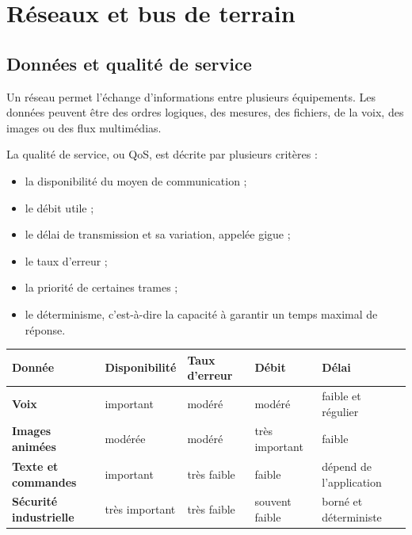 
\section{Réseaux et bus de terrain}
\label{sec:reseaux}

\subsection{Données et qualité de service}

Un réseau permet l'échange d'informations entre plusieurs équipements. Les données peuvent être des ordres logiques, des mesures, des fichiers, de la voix, des images ou des flux multimédias.

La qualité de service, ou QoS, est décrite par plusieurs critères :
\begin{itemize}
  \item la disponibilité du moyen de communication ;
  \item le débit utile ;
  \item le délai de transmission et sa variation, appelée gigue ;
  \item le taux d'erreur ;
  \item la priorité de certaines trames ;
  \item le déterminisme, c'est-à-dire la capacité à garantir un temps maximal de réponse.
\end{itemize}

\begin{center}
\small
\begin{tabularx}{\linewidth}{>{\bfseries}p{2.4cm}XXXX}
\toprule
Donnée & Disponibilité & Taux d'erreur & Débit & Délai \\
\midrule
Voix & important & modéré & modéré & faible et régulier\\
Images animées & modérée & modéré & très important & faible\\
Texte et commandes & important & très faible & faible & dépend de l'application\\
Sécurité industrielle & très important & très faible & souvent faible & borné et déterministe\\
\bottomrule
\end{tabularx}
\end{center}


